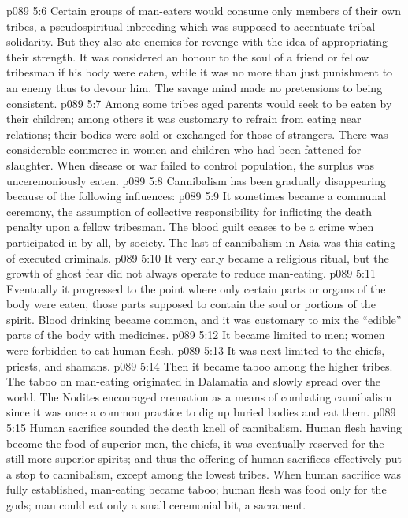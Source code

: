 \vs p089 5:6 Certain groups of man\hyp{}eaters would consume only members of their own tribes, a pseudospiritual inbreeding which was supposed to accentuate tribal solidarity. But they also ate enemies for revenge with the idea of appropriating their strength. It was considered an honour to the soul of a friend or fellow tribesman if his body were eaten, while it was no more than just punishment to an enemy thus to devour him. The savage mind made no pretensions to being consistent.
\vs p089 5:7 Among some tribes aged parents would seek to be eaten by their children; among others it was customary to refrain from eating near relations; their bodies were sold or exchanged for those of strangers. There was considerable commerce in women and children who had been fattened for slaughter. When disease or war failed to control population, the surplus was unceremoniously eaten.
\vs p089 5:8 \pc Cannibalism has been gradually disappearing because of the following influences:
\vs p089 5:9 \bibnobreakspace It sometimes became a communal ceremony, the assumption of collective responsibility for inflicting the death penalty upon a fellow tribesman. The blood guilt ceases to be a crime when participated in by all, by society. The last of cannibalism in Asia was this eating of executed criminals.
\vs p089 5:10 \bibnobreakspace It very early became a religious ritual, but the growth of ghost fear did not always operate to reduce man\hyp{}eating.
\vs p089 5:11 \bibnobreakspace Eventually it progressed to the point where only certain parts or organs of the body were eaten, those parts supposed to contain the soul or portions of the spirit. Blood drinking became common, and it was customary to mix the “edible” parts of the body with medicines.
\vs p089 5:12 \bibnobreakspace It became limited to men; women were forbidden to eat human flesh.
\vs p089 5:13 \bibnobreakspace It was next limited to the chiefs, priests, and shamans.
\vs p089 5:14 \bibnobreakspace Then it became taboo among the higher tribes. The taboo on man\hyp{}eating originated in Dalamatia and slowly spread over the world. The Nodites encouraged cremation as a means of combating cannibalism since it was once a common practice to dig up buried bodies and eat them.
\vs p089 5:15 \bibnobreakspace Human sacrifice sounded the death knell of cannibalism. Human flesh having become the food of superior men, the chiefs, it was eventually reserved for the still more superior spirits; and thus the offering of human sacrifices effectively put a stop to cannibalism, except among the lowest tribes. When human sacrifice was fully established, man\hyp{}eating became taboo; human flesh was food only for the gods; man could eat only a small ceremonial bit, a sacrament.
